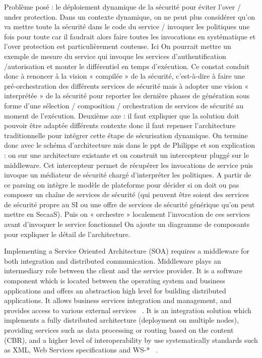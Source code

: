 \documentclass[runningheads,a4paper]{llncs}
\begin{document}
Probl\`eme pos\'e : le d\'eploiement dynamique de la s\'ecurit\'e pour \'eviter l’over / under protection. Dans un contexte dynamique, on ne peut plus consid\'erer qu’on va mettre toute la s\'ecurit\'e dans le code du service / invoquer les politiques  une fois pour toute car il faudrait alors faire toutes les invocations en syst\'ematique et l’over protection est particuli\`erement couteuse. Ici On pourrait mettre un exemple de mesure du service qui invoque les services d’authentification /autorisation et monter le diff\'erentiel en temps d’ex\'ecution. Ce constat conduit donc \`a renoncer \`a la vision « compil\'ee » de la s\'ecurit\'e, c’est-\`a-dire \`a faire une pr\'e-orchestration des diff\'erents services de s\'ecurit\'e mais \`a adopter une vision « interpr\'et\'ee » de la s\'ecurit\'e pour reporter les derni\`ere phases de g\'en\'eration sous forme d’une s\'election / composition / orchestration de services de s\'ecurit\'e au moment de l’ex\'ecution.
Deuxi\`eme axe : il faut expliquer que la solution doit pouvoir \^etre adapt\'ee  diff\'erents contexte donc il faut repenser l’architecture traditionnelle pour int\'egrer cette \'etape de s\'ecurisation dynamique. On termine donc avec le sch\'ema d’architecture mis dans le ppt de Philippe et son explication : on sur une architecture existante et on construit  un intercepteur plugg\'e sur le middleware. Cet intercepteur permet de r\'ecup\'erer les invocations de service puis invoque un m\'ediateur de s\'ecurit\'e charg\'e d’interpr\'eter les politiques. A partir de ce parsing on int\`egre le mod\`ele de plateforme pour d\'ecider si on doit ou pas composer un chaîne de services de s\'ecurit\'e (qui peuvent \^etre soient des services de s\'ecurit\'e propre au SI ou une offre de services de s\'ecurit\'e g\'en\'erique qu’on peut mettre en SecaaS). Puis on « orchestre » localement l’invocation de ces services avant d’invoquer le service fonctionnel
On ajoute un diagramme de composants pour expliquer le d\'etail de l’architecture.

Implementing a Service Oriented Architecture (SOA) requires a middleware for both integration and distributed communication. Middleware plays an intermediary role between the client and the service provider. It is a software component which is located between the operating system and business applications and offers an abstraction high level for building distributed applications. It allows business services integration and management, and provides access to various external services ~\cite{SHLP05}. It is an integration solution which implements a fully distributed architecture (deployment on multiple nodes), providing services such as data processing or routing based on the content (CBR), and a higher level of interoperability by use systematically standards such as XML, Web Services specifications and WS-* ~\cite{Lou08}.
 
\end{document}
